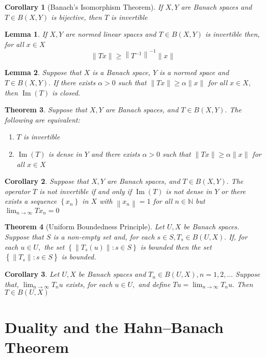\documentclass[10pt]{paper}
\newtheorem{theorem}{Theorem}[section]
\newtheorem{corollary}{Corollary}[section]
\newtheorem{lemma}[theorem]{Lemma}
\begin{document}
\begin{corollary}[Banach's Isomorphism Theorem]
    If $X, Y$ are Banach spaces and $T \in B(X, Y)$ is bijective, then $T$ is invertible
\end{corollary}

\begin{lemma}
    If $X, Y$ are normed linear spaces and $T \in B(X, Y)$ is invertible then, for all $x \in X$
    $$
        \|T x\| \geq\left\|T^{-1}\right\|^{-1}\|x\|
    $$
\end{lemma}

\begin{lemma}
    Suppose that $X$ is a Banach space, $Y$ is a normed space and $T \in B(X, Y) .$ If there exists $\alpha>0$ such that $\|T x\| \geq \alpha\|x\|$ for all $x \in X,$ then $\operatorname{Im}(T)$ is closed.
\end{lemma}

\begin{theorem}
    Suppose that $X, Y$ are Banach spaces, and $T \in B(X, Y) .$ The following are equivalent:
    \begin{enumerate}
        \item $T$ is invertible
        \item $\operatorname{Im}(T)$ is dense in $Y$ and there exists $\alpha>0$ such that $\|T x\| \geq \alpha\|x\|$ for all $x \in X$
    \end{enumerate}
\end{theorem}

\begin{corollary}
    Suppose that $X, Y$ are Banach spaces, and $T \in B(X, Y) .$ The operator $T$ is not invertible if and only if $\operatorname{Im}(T)$ is not dense in $Y$ or there exists a sequence $\left\{x_{n}\right\}$ in $X$ with $\left\|x_{n}\right\|=1$ for all $n \in \mathbb{N}$ but $\lim _{n \rightarrow \infty} T x_{n}=0$
\end{corollary}

\begin{theorem}[Uniform Boundedness Principle]
    Let $U, X$ be Banach spaces. Suppose that $S$ is a non-empty set and, for each $s \in S, T_{s} \in B(U, X) .$ If, for each $u \in U,$ the set $\left\{\left\|T_{s}(u)\right\|: s \in S\right\}$ is bounded then the set $\left\{\left\|T_{s}\right\|: s \in S\right\}$ is bounded.
\end{theorem}

\begin{corollary}
    Let $U, X$ be Banach spaces and $T_{n} \in B(U, X), n=1,2, \ldots$ Suppose that, $\lim _{n \rightarrow \infty} T_{n} u$ exists, for each $u \in U,$ and define $T u=\lim _{n \rightarrow \infty} T_{n} u .$ Then $T \in B(U, X)$
\end{corollary}

\section{Duality and the Hahn–Banach Theorem}

\end{document}
